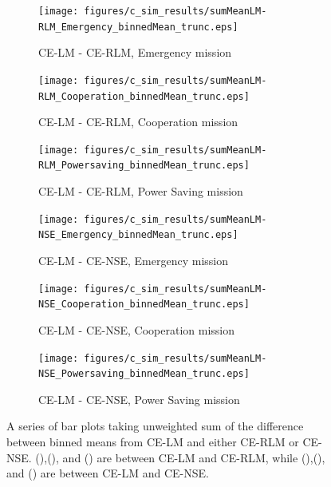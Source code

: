 \begin{figure}[ht]
\begin{subfigure}{0.30\linewidth}
	\centering
	\texttt{[image: figures/c\_sim\_results/sumMeanLM-RLM\_Emergency\_binnedMean\_trunc.eps]}
	\caption{CE-LM - CE-RLM, Emergency mission}
	\label{fig:cSimUnweightEmer_RLM}
\end{subfigure}\hfill%
\begin{subfigure}{0.30\linewidth}
	\centering
	\texttt{[image: figures/c\_sim\_results/sumMeanLM-RLM\_Cooperation\_binnedMean\_trunc.eps]}
	\caption{CE-LM - CE-RLM, Cooperation mission}
	\label{fig:cSimUnweightCoop_RLM}
\end{subfigure}\hfill%
\begin{subfigure}{0.30\linewidth}
	\centering
	\texttt{[image: figures/c\_sim\_results/sumMeanLM-RLM\_Powersaving\_binnedMean\_trunc.eps]}
	\caption{CE-LM - CE-RLM, Power Saving mission}
	\label{fig:cSimUnweightPower_RLM}
\end{subfigure}
\begin{subfigure}{0.30\linewidth}
	\centering
	\texttt{[image: figures/c\_sim\_results/sumMeanLM-NSE\_Emergency\_binnedMean\_trunc.eps]}
	\caption{CE-LM - CE-NSE, Emergency mission}
	\label{fig:cSimUnweightEmer_NSE}
\end{subfigure}\hfill%
\begin{subfigure}{0.30\linewidth}
	\centering
	\texttt{[image: figures/c\_sim\_results/sumMeanLM-NSE\_Cooperation\_binnedMean\_trunc.eps]}
	\caption{CE-LM - CE-NSE, Cooperation mission}
	\label{fig:cSimUnweightCoop_NSE}
\end{subfigure}\hfill%
\begin{subfigure}{0.30\linewidth}
	\centering
	\texttt{[image: figures/c\_sim\_results/sumMeanLM-NSE\_Powersaving\_binnedMean\_trunc.eps]}
	\caption{CE-LM - CE-NSE, Power Saving mission}
	\label{fig:cSimUnweightPower_NSE}
\end{subfigure}%
\caption {A series of bar plots taking unweighted sum of the difference between binned means from CE-LM and either CE-RLM or CE-NSE. (\protect{}),(\protect{}), and (\protect{}) are between CE-LM and CE-RLM, while (\protect{}),(\protect{}), and (\protect{}) are between CE-LM and CE-NSE.} \label{fig:unweight_sumFit} 
\end{figure}
\clearpage

